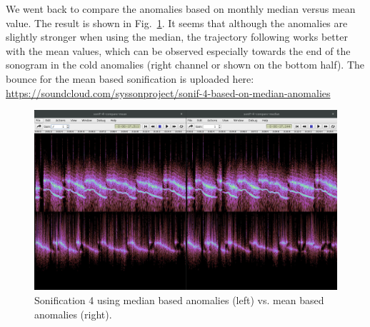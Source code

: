 \documentclass[11pt,a4paper]{article}
\newcommand{\figref}[1]{Fig.~\ref{#1}}
\begin{document}
We went back to compare the anomalies based on monthly median versus mean value. The result is shown in \figref{fig:sonif4-compare-median-mean}. It seems that although the anomalies are slightly stronger when using the median, the trajectory following works better with the mean values, which can be observed especially towards the end of the sonogram in the cold anomalies (right channel or shown on the bottom half). The bounce for the mean based sonification is uploaded here: \url{https://soundcloud.com/syssonproject/sonif-4-based-on-median-anomalies}

\begin{figure}
\includegraphics[width=\textwidth]{figures/sonif4-compare-median-mean.jpg}
\caption{Sonification 4 using median based anomalies (left) vs. mean based anomalies (right).}
\label{fig:sonif4-compare-median-mean}
\end{figure}

\end{document}

